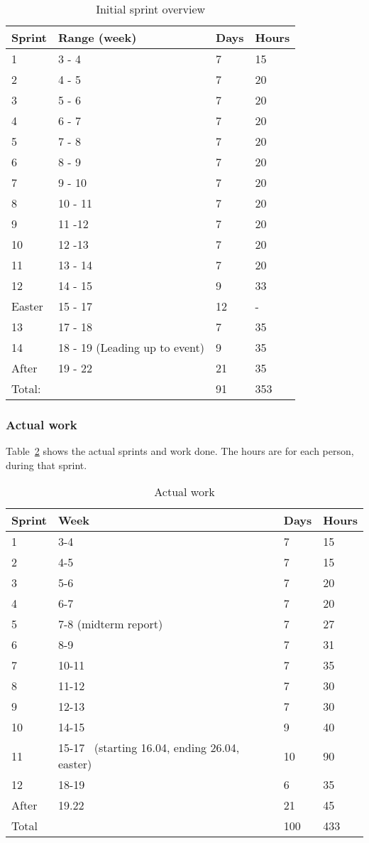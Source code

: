 \begin{table}
\caption{Initial sprint overview}
\label{table:sprintoverview}
\begin{tabular}{|l|l|l|l|}
\hline
 Sprint & Range (week) & Days &
 Hours\\\hline
 1 & 3 - 4 & 7 & 15\\\hline
 2 & 4 - 5 & 7 & 20\\\hline
 3 & 5 - 6 & 7 & 20 \\\hline
 4 & 6 - 7 & 7 & 20 \\\hline
 5 & 7 - 8 & 7 & 20\\\hline
 6 & 8 - 9  & 7 & 20\\\hline
 7 & 9 - 10 & 7 & 20\\\hline
 8 & 10 - 11 & 7 & 20\\\hline
 9 & 11 -12 & 7 & 20\\\hline
 10 & 12 -13 & 7 & 20\\\hline
 11 & 13 - 14 & 7 & 20\\\hline
 12  & 14 - 15  & 9 & 33\\\hline
 Easter & 15 - 17 & 12 & {}-\\\hline
 13 & 17 - 18 & 7 & 35\\\hline
 14 & 18 - 19 (Leading up to event) & 9 & 35\\\hline
 After & 19 - 22 & 21 & 35\\\hline
 Total:  & & 91 & 353\\\hline
\end{tabular}
\end{table}


\subsubsection{Actual work}
Table~\ref{table:actualWork} shows the actual sprints and work done. The hours are for each
person, during that sprint.
\begin{table}
\caption{Actual work}
\label{table:actualWork}
\begin{tabular}{|l|l|l|l|}
\hline
 Sprint & Week & Days & Hours \\\hline
 1 & 3-4 & 7 & 15\\\hline
 2 & 4-5  & 7  & 15\\\hline
 3 & 5-6 & 7  & 20\\\hline
 4 & 6-7 & 7 & 20\\\hline
 5 & 7-8 (midterm report) & 7 & 27\\\hline
 6 & 8-9  & 7  & 31\\\hline
 7 & 10-11 & 7  & 35\\\hline
 8 & 11-12 & 7 & 30\\\hline
 9 & 12-13 & 7  & 30\\\hline
 10 & 14-15 & 9 & 40\\\hline
 11 & 15-17 \ (starting 16.04, ending 26.04, easter) & 10 & 90\\\hline
 12 & 18-19 & 6 & 35\\\hline
 After & 19.22 & 21 & 45\\\hline
 Total & & 100 & 433\\\hline
\end{tabular}
\end{table}

